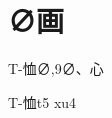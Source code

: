 
\section*{∅画}

\begin{entry}{T-恤}{∅,9}{∅、⼼}
  \begin{phonetics}{T-恤}{t5 xu4}
  \end{phonetics}
\end{entry}


